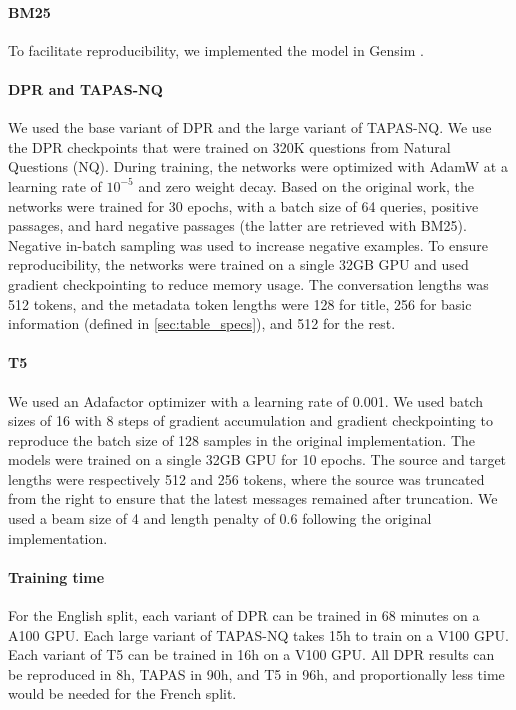 \documentclass[11pt]{article}
\begin{document}
\paragraph{BM25} To facilitate reproducibility, we implemented the model in Gensim \citep{rehurek_software_2010}.

\paragraph{DPR and TAPAS-NQ} We used the base variant of DPR and the large variant of TAPAS-NQ. We use the DPR checkpoints that were trained on 320K questions from Natural Questions \citep{kwiatkowski_natural_2019} (NQ). During training, the networks were optimized with AdamW \citep{Loshchilov2017DecoupledWD} at a learning rate of $10^{-5}$ and zero weight decay. Based on the original work, the networks were trained for 30 epochs, with a batch size of 64 queries, positive passages, and hard negative passages (the latter are retrieved with BM25). Negative in-batch sampling was used to increase negative examples. To ensure reproducibility, the networks were trained on a single 32GB GPU and used gradient checkpointing \citep{chen_training_2016} to reduce memory usage. The conversation lengths was 512 tokens, and the metadata token lengths were 128 for title, 256 for basic information (defined in \autoref{sec:table_specs}), and 512 for the rest. 

\paragraph{T5} We used an Adafactor optimizer \citep{pmlr-v80-shazeer18a} with a learning rate of 0.001. We used batch sizes of 16 with 8 steps of gradient accumulation and gradient checkpointing to reproduce the batch size of 128 samples in the original implementation. The models were trained on a single 32GB GPU for 10 epochs. The source and target lengths were respectively 512 and 256 tokens, where the source was truncated from the right to ensure that the latest messages remained after truncation. We used a beam size of 4 and length penalty of 0.6 following the original implementation.

\paragraph{Training time} For the English split, each variant of DPR can be trained in 68 minutes on a A100 GPU. Each large variant of TAPAS-NQ takes 15h to train on a V100 GPU. Each variant of T5 can be trained in 16h on a V100 GPU. All DPR results can be reproduced in 8h, TAPAS in 90h, and T5 in 96h, and proportionally less time would be needed for the French split.
\end{document}
